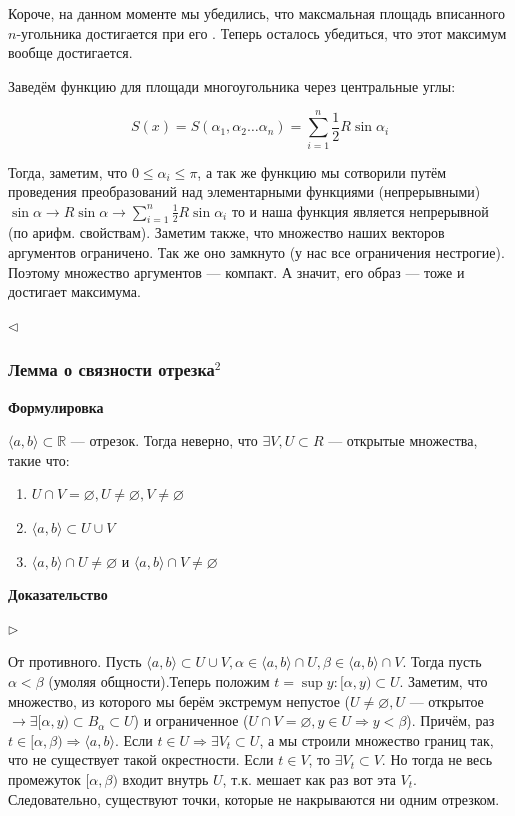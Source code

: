 \documentclass{article}
\begin{document}
Короче, на данном моменте мы убедились, что максмальная площадь вписанного $n$-угольника достигается при его \Male. Теперь осталось убедиться, что этот максимум вообще достигается.

Заведём функцию для площади многоугольника через центральные углы:

\[S(x) =  S(\alpha_1, \alpha_2 \ldots \alpha_n) = \sum_{i = 1}^n{\frac{1}{2}R\sin\alpha_i}\]

Тогда, заметим, что $0 \le \alpha_i \le \pi$, а так же функцию мы сотворили путём проведения преобразований над элементарными функциями (непрерывными) $\sin \alpha \rightarrow R\sin\alpha \rightarrow \sum_{i = 1}^n{\frac{1}{2}R\sin\alpha_i}$ то и наша функция является непрерывной (по арифм. свойствам). Заметим также, что множество наших векторов аргументов ограничено. Так же оно замкнуто (у нас все ограничения нестрогие). Поэтому множество аргументов --- компакт. А значит, его образ --- тоже и достигает максимума.

$\lhd$

\subsubsection{Лемма о связности отрезка\texorpdfstring{$^2$}{}}

\textbf{Формулировка}

$\langle a, b\rangle \subset \mathbb{R}$ --- отрезок. Тогда неверно, что $\exists V, U \subset{R}$ --- открытые множества, такие что:

\begin{enumerate}
    \item $U \cap V = \varnothing, U \neq \varnothing, V \neq \varnothing$
    \item $\langle a, b\rangle \subset U \cup V$
    \item $\langle a, b\rangle \cap U \neq \varnothing$ и $\langle a, b\rangle \cap V \neq \varnothing$
\end{enumerate}

\textbf{Доказательство}

$\rhd$

От противного. Пусть $\langle a, b\rangle \subset U \cup V, \alpha \in \langle a, b\rangle \cap U, \beta \in  \langle a, b\rangle \cap V$. Тогда пусть $\alpha < \beta$ ( умоляя общности\Male).Теперь положим $t = \sup{y : [\alpha, y) \subset U}$. Заметим, что множество, из которого мы берём экстремум непустое ($U \neq \varnothing, U$ --- открытое $\rightarrow \exists [\alpha, y) \subset B_\alpha \subset U$) и ограниченное ($U \cap V = \varnothing, y \in U \Rightarrow y < \beta$). Причём, раз $t \in [\alpha, \beta) \Rightarrow \langle a, b\rangle$. Если $t \in U \Rightarrow \exists V_t \subset U$, а мы строили множество границ так, что не существует такой окрестности. Если $t \in V$, то $\exists V_t \subset V$. Но тогда не весь промежуток $[\alpha, \beta)$ входит внутрь $U$, т.к. мешает как раз вот эта $V_t$. Следовательно, существуют точки, которые не накрываются ни одним отрезком.
\end{document}
